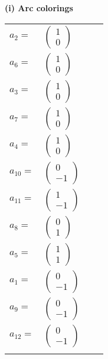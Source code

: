 \documentclass[1p]{elsarticle_modified}
\theoremstyle{definition}
\begin{document}
\flushleft \textbf{(i) Arc colorings}\\
\begin{tabular}{m{7pt} m{180pt} m{7pt} m{180pt} }
\flushright $a_{2}=$&$\begin{pmatrix}1\\0\end{pmatrix}$ \\
\flushright $a_{6}=$&$\begin{pmatrix}1\\0\end{pmatrix}$ \\
\flushright $a_{3}=$&$\begin{pmatrix}1\\0\end{pmatrix}$ \\
\flushright $a_{7}=$&$\begin{pmatrix}1\\0\end{pmatrix}$ \\
\flushright $a_{4}=$&$\begin{pmatrix}1\\0\end{pmatrix}$ \\
\flushright $a_{10}=$&$\begin{pmatrix}0\\-1\end{pmatrix}$ \\
\flushright $a_{11}=$&$\begin{pmatrix}1\\-1\end{pmatrix}$ \\
\flushright $a_{8}=$&$\begin{pmatrix}0\\1\end{pmatrix}$ \\
\flushright $a_{5}=$&$\begin{pmatrix}1\\1\end{pmatrix}$ \\
\flushright $a_{1}=$&$\begin{pmatrix}0\\-1\end{pmatrix}$ \\
\flushright $a_{9}=$&$\begin{pmatrix}0\\-1\end{pmatrix}$ \\
\flushright $a_{12}=$&$\begin{pmatrix}0\\-1\end{pmatrix}$\\&\end{tabular}
\end{document}

